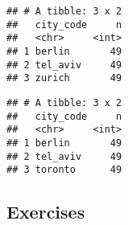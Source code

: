 \documentclass[]{book}
\newenvironment{Shaded}{\begin{snugshade}}{\end{snugshade}}
\newcommand{\DataTypeTok}[1]{\textcolor[rgb]{0.13,0.29,0.53}{#1}}
\newcommand{\KeywordTok}[1]{\textcolor[rgb]{0.13,0.29,0.53}{\textbf{#1}}}
\newcommand{\NormalTok}[1]{#1}
\newcommand{\OperatorTok}[1]{\textcolor[rgb]{0.81,0.36,0.00}{\textbf{#1}}}
\newcommand{\OtherTok}[1]{\textcolor[rgb]{0.56,0.35,0.01}{#1}}
\newcommand{\StringTok}[1]{\textcolor[rgb]{0.31,0.60,0.02}{#1}}
\begin{document}
\begin{verbatim}
## # A tibble: 3 x 2
##   city_code     n
##   <chr>     <int>
## 1 berlin       49
## 2 tel_aviv     49
## 3 zurich       49
\end{verbatim}

\begin{Shaded}
\end{Shaded}

\begin{verbatim}
## # A tibble: 3 x 2
##   city_code     n
##   <chr>     <int>
## 1 berlin       49
## 2 tel_aviv     49
## 3 toronto      49
\end{verbatim}

\hypertarget{exercises-18}{%
\subsection{Exercises}\label{exercises-18}}
\end{document}
